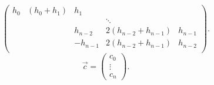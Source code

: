 \documentclass{report}
\begin{document}
\begin{solution}
\begin{enumerate}[label=(\alph*)]
\[\begin{pmatrix}
				      h_0  & (h_0+h_1) & h_1      &                     &         \\
				           &           &          & \ddots              &         \\
				           &           & h_{n-2}  & 2(h_{n-2} +h_{n-1}) & h_{n-1} \\
				           &           & -h_{n-1} & 2(h_{n-2} +h_{n-1}) & h_{n-2} \\
			      \end{pmatrix}
			      .\]
		      \[
			      \vec{{c}} =  \begin{pmatrix} c_0\\ \vdots\\ c_n \end{pmatrix}
			      .\]
	\end{enumerate}
\end{solution}
\end{document}
